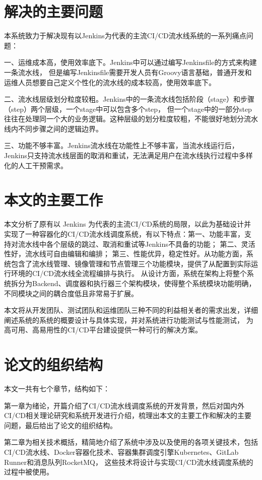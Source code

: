 \section{解决的主要问题}
本系统致力于解决现有以Jenkins为代表的主流CI/CD流水线系统的一系列痛点问题：

一、运维成本高，使用效率底下。Jenkins中可以通过编写Jenkinsfile的方式来构建一条流水线，
但是编写Jenkinsfile需要开发人员有Groovy语言基础，普通开发和运维人员想要自己定义个性化的流水线的成本较高，使用效率底下。

二、流水线层级划分粒度较粗。Jenkins中的一条流水线包括阶段（stage）和步骤（step）两个层级，一个stage中可以包含多个step，
但一个stage中的一部分step往往在处理同一个大的业务逻辑。这种层级的划分粒度较粗，不能很好地划分流水线内不同步骤之间的逻辑边界。

三、功能不够丰富。Jenkins流水线在功能性上不够丰富，当流水线运行后，Jenkins只支持流水线层面的取消和重试，无法满足用户在流水线执行过程中多样化的人工干预需求。


\section{本文的主要工作}
本文分析了原有以 Jenkins 为代表的主流CI/CD系统的局限，以此为基础设计并实现了一种容器化的CI/CD流水线调度系统，有以下特点：第一、功能丰富，支持对流水线中各个层级的跳过、取消和重试等Jenkins不具备的功能；
第二、灵活性好，流水线可自由编辑和编排；
第三、性能优异，稳定性好。从功能方面，系统包含了流水线管理、镜像管理和节点管理三个功能模块，提供了从配置到实际运行环境的CI/CD流水线全流程编排与执行。
从设计方面，系统在架构上将整个系统拆分为Backend、调度器和执行器三个架构模块，使得整个系统模块功能明确，不同模块之间的耦合度低且非常易于扩展。

本文将从开发团队、测试团队和运维团队三种不同的利益相关者的需求出发，详细阐述系统的系统的概要设计与具体实现，并对系统进行功能测试与性能测试，
为高可用、高易用性的CI/CD平台建设提供一种可行的解决方案。

\section{论文的组织结构}
本文一共有七个章节，结构如下：

第一章为绪论，开篇介绍了CI/CD流水线调度系统的开发背景，然后对国内外CI/CD相关理论研究和系统开发进行介绍，梳理出本文的主要工作和解决的主要问题，最后给出了论文的组织结构。

第二章为相关技术概括，精简地介绍了系统中涉及以及使用的各项关键技术，包括CI/CD流水线、Docker容器化技术、容器集群调度引擎Kubernetes、GitLab Runner和消息队列RocketMQ，
这些技术将设计与实现CI/CD流水线调度系统的过程中被使用。

